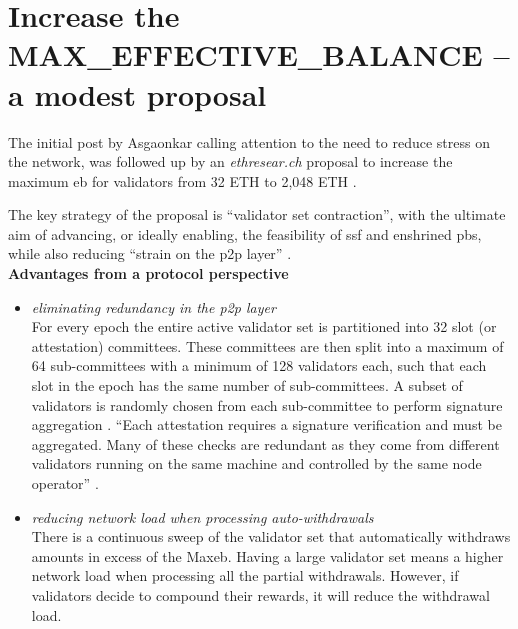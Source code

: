 \documentclass{article}
\begin{document}
\section{Increase the MAX\_EFFECTIVE\_BALANCE – a modest proposal}
\label{sec:modest}

The initial post by Asgaonkar \cite{Asgaonkar2023} calling attention to the
need to reduce stress on the network, was followed up by an
\textit{ethresear.ch} proposal to increase the maximum \gls{eb} for validators
from 32 ETH to 2,048 ETH \cite{Neuder2023a}.

The key strategy of the proposal is ``validator set contraction'', with the
ultimate aim of advancing, or ideally enabling, the feasibility of \gls{ssf}
and  enshrined \gls{pbs}, while also reducing ``strain on the \gls{p2p} layer''
\cite{Neuder2023a}.\\

\noindent \textbf{Advantages from a protocol perspective}
\begin{itemize}
  \item \textit{eliminating redundancy in the \gls{p2p} layer}\\
    For every epoch the entire active validator set is partitioned into 32 slot
    (or attestation) committees. These committees are then split into a maximum
    of 64 sub-committees with a minimum of 128 validators each, such that each
    slot in the epoch has the same number of sub-committees. A subset of
    validators is randomly chosen from each sub-committee to perform signature
    aggregation \cite{Edgington2023}. ``Each attestation requires a signature
    verification and must be aggregated. Many of these checks are redundant as
    they come from different validators running on the same machine and
    controlled by the same node operator'' \cite{Neuder2023a}. 

  \item \textit{reducing network load when processing auto-withdrawals}\\
    There is a continuous sweep of the validator set that automatically
    withdraws amounts in excess of the Max\gls{eb}. Having a large validator
    set means a higher network load when processing all the partial
    withdrawals. However, if validators decide to compound their rewards, it
    will reduce the withdrawal load.
\end{itemize}
\end{document}
